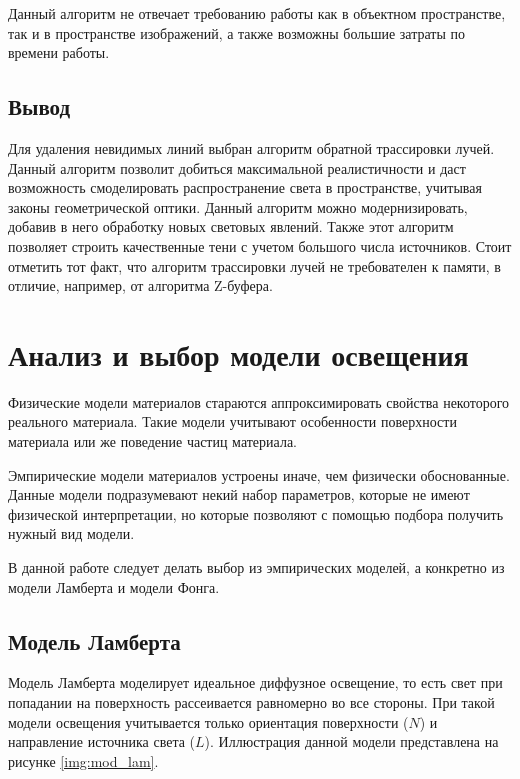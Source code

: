 Данный алгоритм не отвечает требованию работы как в объектном пространстве, так и в пространстве изображений, а также возможны большие затраты по времени работы.


\subsection{Вывод}
Для удаления невидимых линий выбран алгоритм обратной трассировки лучей. Данный алгоритм позволит добиться максимальной реалистичности и даст возможность смоделировать распространение света в пространстве, учитывая законы геометрической оптики. Данный алгоритм можно модернизировать, добавив в него обработку новых световых явлений. Также этот алгоритм позволяет строить качественные тени с учетом большого числа источников. Стоит отметить тот факт, что алгоритм трассировки лучей не требователен к памяти, в отличие, например, от алгоритма Z-буфера.


\section{Анализ и выбор модели освещения}

Физические модели материалов стараются аппроксимировать свойства некоторого реального материала. Такие модели учитывают особенности поверхности материала или же поведение частиц материала.

Эмпирические модели материалов устроены иначе, чем физически обоснованные. Данные модели подразумевают некий набор параметров, которые не имеют физической интерпретации, но которые позволяют с помощью подбора получить нужный вид модели.

В данной работе следует делать выбор из эмпирических моделей, а конкретно из модели Ламберта и модели Фонга.

\subsection{Модель Ламберта}

Модель Ламберта \cite{lamber_fong} моделирует идеальное диффузное освещение, то есть свет при попадании на поверхность рассеивается равномерно во все стороны. При такой модели освещения учитывается только ориентация поверхности ($N$) и направление источника света ($L$). Иллюстрация данной модели представлена на рисунке \ref{img:mod_lam}.


